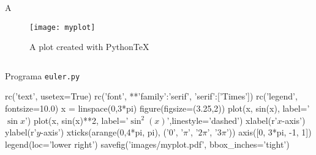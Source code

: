 
\begin{frame}
\frametitle{\subsecname}

\begin{minipage}{0.45\paperwidth}
\begin{example}
	A
\end{example}
\vfill
\begin{figure}[H]
	\centering
	\texttt{[image: myplot]}
	\caption{\label{fig:matlpotlib} A plot created with PythonTeX}
\end{figure}
\end{minipage}
\hfill
\begin{minipage}{0.45\paperwidth}
		\begin{listing}[H]
		\inputminted{python}{./code/euler_01.py}
		\caption{Programa \texttt{euler.py}}
	\end{listing}
\end{minipage}
\end{frame}

\begin{frame}[fragile]
\begin{pylabcode}[plotsession]
rc('text', usetex=True)
rc('font', **{'family':'serif', 'serif':['Times']})
rc('legend', fontsize=10.0)
x = linspace(0,3*pi)
figure(figsize=(3.25,2))
plot(x, sin(x), label='$\sin x$')
plot(x, sin(x)**2, label='$\sin^{2}(x)$',linestyle='dashed')
xlabel(r'$x$-axis')
ylabel(r'$y$-axis')
xticks(arange(0,4*pi, pi), ('$0$', '$\pi$', '$2\pi$', '$3\pi$'))
axis([0, 3*pi, -1, 1])
legend(loc='lower right')
savefig('images/myplot.pdf', bbox_inches='tight')
\end{pylabcode}
\end{frame}
